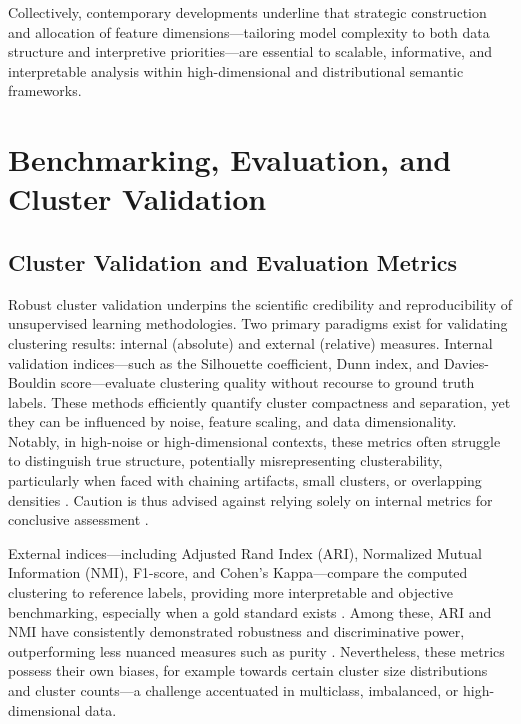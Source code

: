 \documentclass[sigconf]{acmart}
\begin{document}
Collectively, contemporary developments underline that strategic construction and allocation of feature dimensions—tailoring model complexity to both data structure and interpretive priorities—are essential to scalable, informative, and interpretable analysis within high-dimensional and distributional semantic frameworks.

\section{Benchmarking, Evaluation, and Cluster Validation}

\subsection{Cluster Validation and Evaluation Metrics}

Robust cluster validation underpins the scientific credibility and reproducibility of unsupervised learning methodologies. Two primary paradigms exist for validating clustering results: internal (absolute) and external (relative) measures. Internal validation indices—such as the Silhouette coefficient, Dunn index, and Davies-Bouldin score—evaluate clustering quality without recourse to ground truth labels. These methods efficiently quantify cluster compactness and separation, yet they can be influenced by noise, feature scaling, and data dimensionality. Notably, in high-noise or high-dimensional contexts, these metrics often struggle to distinguish true structure, potentially misrepresenting clusterability, particularly when faced with chaining artifacts, small clusters, or overlapping densities \cite{ref14,ref16,ref17,ref20,ref21,ref22,ref45,ref46,ref50,ref59,ref60,ref67,ref71,ref72,ref74,ref75,ref78,ref90,ref92,ref93,ref94,ref95,ref96,ref97,ref100,ref113}. Caution is thus advised against relying solely on internal metrics for conclusive assessment \cite{ref14,ref94}.

External indices—including Adjusted Rand Index (ARI), Normalized Mutual Information (NMI), F1-score, and Cohen’s Kappa—compare the computed clustering to reference labels, providing more interpretable and objective benchmarking, especially when a gold standard exists \cite{ref14,ref16,ref17,ref21,ref22,ref44,ref45,ref46,ref50,ref67,ref72,ref75,ref77,ref78,ref90,ref93,ref94,ref95,ref96,ref97,ref100,ref113}. Among these, ARI and NMI have consistently demonstrated robustness and discriminative power, outperforming less nuanced measures such as purity \cite{ref17,ref44}. Nevertheless, these metrics possess their own biases, for example towards certain cluster size distributions and cluster counts—a challenge accentuated in multiclass, imbalanced, or high-dimensional data.
\end{document}
